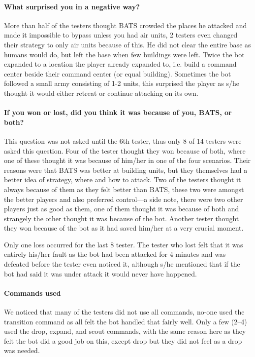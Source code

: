 \paragraph{What surprised you in a negative way?}
More than half of the testers thought BATS crowded the places he attacked and made it impossible to
bypass unless you had air units, 2 testers even changed their strategy to only air units because of
this. He did not clear the entire base as humans would do, but left the base when few buildings were
left. Twice the bot expanded to a location the player already expanded to, i.e. build a command
center beside their command center (or equal building). Sometimes the bot followed a small army
consisting of 1-2 units, this surprised the player as s/he thought it would either retreat or continue
attacking on its own.

\paragraph{If you won or lost, did you think it was because of you, BATS, or both?}
This question was not asked until the 6th tester, thus only 8 of 14 testers were asked this
question. Four of the tester thought they won because of both, where one of these thought it was
because of him/her in one of the four scenarios. Their reasons were that BATS was better at building
units, but they themselves had a better idea of strategy, where and how to attack. Two of the
testers thought it always because of them as they felt better than BATS, these two were amongst the
better players and also preferred control—a side note, there were two other players just as good as
them, one of them thought it was because of both and strangely the other thought it was because of
the bot. Another tester thought they won because of the bot as it had saved him/her at a very
crucial moment.

Only one loss occurred for the last 8 tester. The tester who lost felt that it was entirely
his/her fault as the bot had been attacked for 4 minutes and was defeated before the tester even
noticed it, although s/he mentioned that if the bot had said it was under attack it would never have
happened.

\paragraph{Commands used}
We noticed that many of the testers did not use all commands, no-one used the transition command as
all felt the bot handled that fairly well. Only a few (2–4) used the drop, expand, and scout
commands, with the same reason here as they felt the bot did a good job on this, except drop but
they did not feel as a drop was needed.


